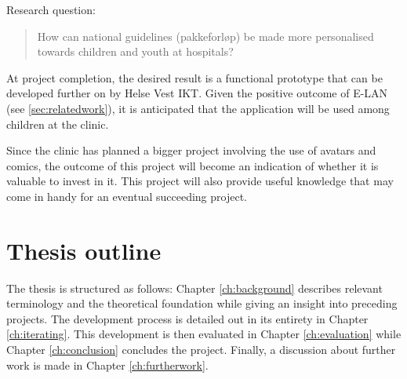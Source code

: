 Research question:

\begin{quote}
    How can national guidelines (pakkeforløp) be made more personalised towards children and youth at hospitals?
\end{quote}

At project completion, the desired result is a functional prototype that can be developed further on by Helse Vest IKT. Given the positive outcome of E-LAN (see \ref{sec:relatedwork}), it is anticipated that the application will be used among children at the clinic.

Since the clinic has planned a bigger project involving the use of avatars and comics, the outcome of this project will become an indication of whether it is valuable to invest in it. This project will also provide useful knowledge that may come in handy for an eventual succeeding project.

\section{Thesis outline}

The thesis is structured as follows: Chapter \ref{ch:background} describes relevant terminology and the theoretical foundation while giving an insight into preceding projects. The development process is detailed out in its entirety in Chapter \ref{ch:iterating}. This development is then evaluated in Chapter \ref{ch:evaluation} while Chapter \ref{ch:conclusion} concludes the project. Finally, a discussion about further work is made in Chapter \ref{ch:furtherwork}.
